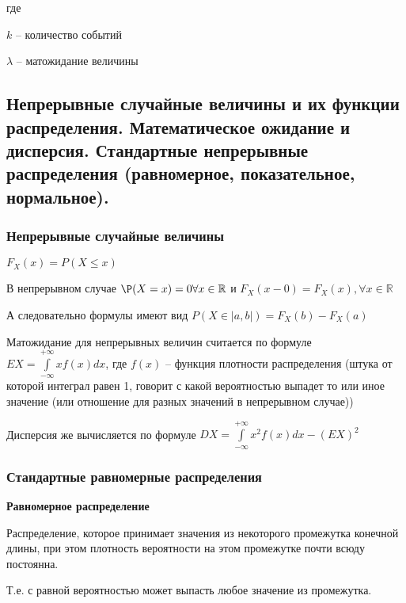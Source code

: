 \documentclass{article}
\begin{document}
где 

$k$ -- количество событий

$\lambda$ -- матожидание величины 



\subsection{Непрерывные случайные величины и их функции распределения. Математическое ожидание и дисперсия. Стандартные непрерывные распределения (равномерное, показательное, нормальное).}

\subsubsection{Непрерывные случайные величины}


$F_X(x) = P(X \le x)$


В непрерывном случае $\P(X = x) = 0 \forall x \in \mathbb{R}$
 и $F_X(x - 0) = F_X(x), \forall x \in \mathbb{R}$
 
А следовательно формулы имеют вид $P(X \in |a, b|) = F_X(b) - F_X(a)$



Матожидание для непрерывных величин считается по формуле $EX = \int\limits_{-\infty}^{+\infty}xf(x)dx$, где $f(x)$ -- функция плотности распределения (штука от которой интеграл равен 1, говорит с какой вероятностью выпадет то или иное значение (или отношение для разных значений в непрерывном случае))


Дисперсия же вычисляется по формуле $DX = \int\limits_{-\infty}^{+\infty} x^2 f(x) dx - (EX)^2$

\subsubsection{Стандартные равномерные распределения}

{\bf Равномерное распределение}

Распределение, которое принимает значения из некоторого промежутка конечной длины, при этом плотность вероятности на этом промежутке почти всюду постоянна.

Т.е. с равной вероятностью может выпасть любое значение из промежутка.
\end{document}
